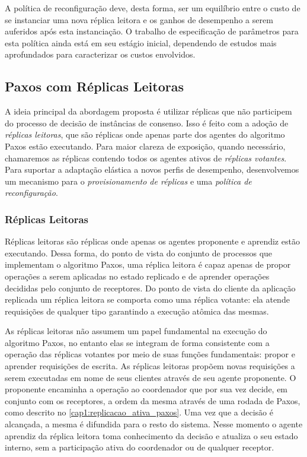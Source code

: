 A política de reconfiguração deve, desta forma, ser um equilíbrio entre o custo de se
instanciar uma nova réplica leitora e os ganhos de desempenho a serem auferidos após esta
instanciação. O trabalho de especificação de parâmetros para esta política ainda está em
seu estágio inicial, dependendo de estudos mais aprofundados para caracterizar os custos
envolvidos.

\subsection{Paxos com Réplicas Leitoras}\label{sec:replicas_leitoras}

A ideia principal da abordagem proposta é utilizar réplicas que não participem do processo
de decisão de instâncias de consenso. Isso é feito com a adoção de \emph{réplicas
leitoras}, que são réplicas onde apenas parte dos agentes do algoritmo Paxos estão
executando. Para maior clareza de exposição, quando necessário, chamaremos as réplicas
contendo todos os agentes ativos de \emph{réplicas votantes}. Para suportar a adaptação
elástica a novos perfis de desempenho, desenvolvemos um mecanismo para o
\emph{provisionamento de réplicas} e uma \emph{política de reconfiguração}.

\subsubsection{Réplicas Leitoras}

Réplicas leitoras são réplicas onde apenas os agentes proponente e aprendiz estão
executando. Dessa forma, do ponto de vista do conjunto de processos que implementam o
algoritmo Paxos, uma réplica leitora é capaz apenas de propor operações a serem aplicadas
no estado replicado e de aprender operações decididas pelo conjunto de receptores. Do
ponto de vista do cliente da aplicação replicada um réplica leitora se comporta como uma
réplica votante: ela atende requisições de qualquer tipo garantindo a execução atômica das
mesmas.

As réplicas leitoras não assumem um papel fundamental na execução do algoritmo Paxos, no
entanto elas se integram de forma consistente com a operação das réplicas votantes por
meio de suas funções fundamentais: propor e aprender requisições de escrita. As réplicas
leitoras propõem novas requisições a serem executadas em nome de seus clientes através de
seu agente proponente. O proponente encaminha a operação ao coordenador que por sua vez
decide, em conjunto com os receptores, a ordem da mesma através de uma rodada de Paxos,
como descrito no \autoref{cap1:replicacao_ativa_paxos}. Uma vez que a decisão é alcançada,
a mesma é difundida para o resto do sistema. Nesse momento o agente aprendiz da réplica
leitora toma conhecimento da decisão e atualiza o seu estado interno, sem a participação
ativa do coordenador ou de qualquer receptor.

